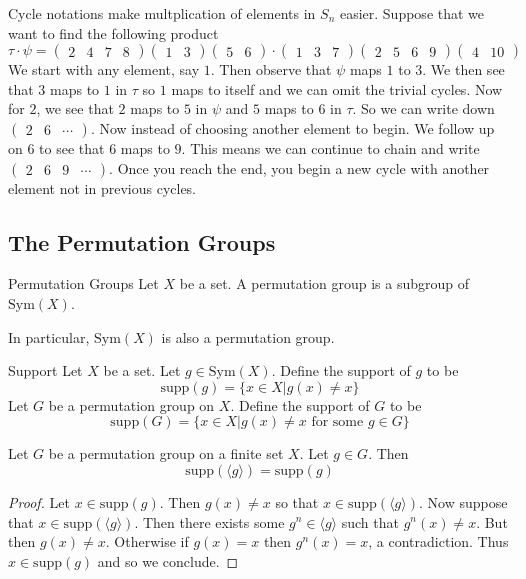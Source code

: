 \documentclass[a4paper]{article}
\begin{document}
Cycle notations make multplication of elements in $S_n$ easier. Suppose that we want to find the following product $$\tau\cdot\psi=\begin{pmatrix}2&4&7&8\end{pmatrix}\begin{pmatrix}1&3\end{pmatrix}\begin{pmatrix}5&6\end{pmatrix}\cdot\begin{pmatrix}1 & 3 & 7\end{pmatrix}\begin{pmatrix}2&5&6&9\end{pmatrix}\begin{pmatrix}4&10\end{pmatrix}$$
We start with any element, say $1$. Then observe that $\psi$ maps $1$ to $3$. We then see that $3$ maps to $1$ in $\tau$ so $1$ maps to itself and we can omit the trivial cycles. Now for $2$, we see that $2$ maps to $5$ in $\psi$ and $5$ maps to $6$ in $\tau$. So we can write down $\begin{pmatrix}2&6&\cdots\end{pmatrix}$. Now instead of choosing another element to begin. We follow up on $6$ to see that $6$ maps to $9$. This means we can continue to chain and write $\begin{pmatrix}2&6&9&\cdots\end{pmatrix}$. Once you reach the end, you begin a new cycle with another element not in previous cycles. 

\subsection{The Permutation Groups}
\begin{defn}{Permutation Groups}{} Let $X$ be a set. A permutation group is a subgroup of $\text{Sym}(X)$. 
\end{defn}

In particular, $\text{Sym}(X)$ is also a permutation group. 

\begin{defn}{Support}{} Let $X$ be a set. Let $g\in\text{Sym}(X)$. Define the support of $g$ to be $$\text{supp}(g)=\{x\in X|g(x)\neq x\}$$ Let $G$ be a permutation group on $X$. Define the support of $G$ to be $$\text{supp}(G)=\{x\in X|g(x)\neq x\text{ for some }g\in G\}$$
\end{defn}

\begin{lmm}{}{} Let $G$ be a permutation group on a finite set $X$. Let $g\in G$. Then $$\text{supp}(\langle g\rangle)=\text{supp}(g)$$ 
\begin{proof}
Let $x\in\text{supp}(g)$. Then $g(x)\neq x$ so that $x\in\text{supp}(\langle g\rangle)$. Now suppose that $x\in\text{supp}(\langle g\rangle)$. Then there exists some $g^n\in\langle g\rangle$ such that $g^n(x)\neq x$. But then $g(x)\neq x$. Otherwise if $g(x)=x$ then $g^n(x)=x$, a contradiction. Thus $x\in\text{supp}(g)$ and so we conclude. 
\end{proof}
\end{lmm}
\end{document}
